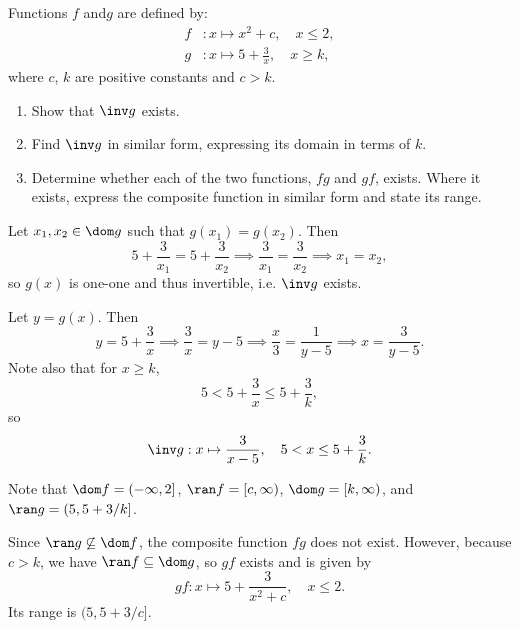 \begin{problem}
    Functions $f$ and$ g$ are defined by:
    \begin{align*}
        f &: x \mapsto x^2 + c, \quad x \leq 2,\\
        g &: x \mapsto 5 + \frac3x, \quad x \geq k,
    \end{align*}
    where $c$, $k$ are positive constants and $c>k$.
    \begin{enumerate}
        \item Show that $\inv g$ exists.
        \item Find $\inv g$ in similar form, expressing its domain in terms of $k$.
        \item Determine whether each of the two functions, $fg$ and $gf$, exists. Where it exists, express the composite function in similar form and state its range.
    \end{enumerate}
\end{problem}
\begin{solution}
    \begin{ppart}
        Let $x_1, x_2 \in \dom g$ such that $g(x_1) = g(x_2)$. Then \[5 + \frac3{x_1} = 5 + \frac3{x_2} \implies \frac3{x_1} = \frac3{x_2} \implies x_1 = x_2,\] so $g(x)$ is one-one and thus invertible, i.e. $\inv g$ exists.
    \end{ppart}
    \begin{ppart}
        Let $y = g(x)$. Then \[y = 5 + \frac3x \implies \frac3x = y - 5 \implies \frac{x}3 = \frac1{y-5} \implies x = \frac{3}{y-5}.\] Note also that for $x \geq k$, \[5 < 5 + \frac3x \leq 5 + \frac3k,\] so \[\inv g : x \mapsto \frac3{x-5}, \quad 5 < x \leq 5 + \frac3k.\]
    \end{ppart}
    \begin{ppart}
        Note that $\dom f = (-\infty, 2]$, $\ran f = [c, \infty)$, $\dom g = [k, \infty)$, and $\ran g = (5, 5 + 3/k]$.

        Since $\ran g \not\subseteq \dom f$, the composite function $fg$ does not exist. However, because $c>k$, we have $\ran f \subseteq \dom g$, so $gf$ exists and is given by \[gf : x \mapsto 5 + \frac3{x^2 + c}, \quad x \leq 2.\] Its range is $(5, 5 + 3/c]$.
    \end{ppart}
\end{solution}

